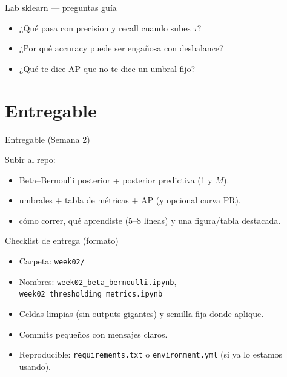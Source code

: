 \begin{frame}{Lab sklearn — preguntas guía}

\begin{itemize}
  \item ¿Qué pasa con precision y recall cuando subes \(\tau\)?
  \item ¿Por qué accuracy puede ser engañosa con desbalance?
  \item ¿Qué te dice AP que no te dice un umbral fijo?
\end{itemize}
\end{frame}

\section[Entregable]{Entregable\label{sec:entregable}}

\begin{frame}{Entregable (Semana 2)}

Subir al repo:
\begin{itemize}
  \item {} Beta–Bernoulli posterior + posterior predictiva (1 y \(M\)).
  \item {} umbrales + tabla de métricas + AP (y opcional curva PR).
  \item {} cómo correr, qué aprendiste (5–8 líneas) y una figura/tabla destacada.
\end{itemize}
\end{frame}

\begin{frame}{Checklist de entrega (formato)}

\begin{itemize}
  \item Carpeta: \texttt{week02/}
  \item Nombres: \texttt{week02\_beta\_bernoulli.ipynb}, \texttt{week02\_thresholding\_metrics.ipynb}
  \item Celdas limpias (sin outputs gigantes) y semilla fija donde aplique.
  \item Commits pequeños con mensajes claros.
  \item Reproducible: \texttt{requirements.txt} o \texttt{environment.yml} (si ya lo estamos usando).
\end{itemize}
\end{frame}

